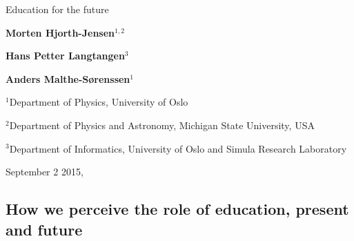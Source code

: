 \documentclass[%
oneside,                 %
final,                   %
10pt]{article}
\begin{document}






\thispagestyle{empty}

\begin{center}
{\LARGE\bf
\begin{spacing}{1.25}
Education for the future
\end{spacing}
}
\end{center}


\begin{center}
{\bf Morten Hjorth-Jensen${}^{1, 2}$} \\ [0mm]
\end{center}


\begin{center}
{\bf Hans Petter Langtangen${}^{3}$} \\ [0mm]
\end{center}


\begin{center}
{\bf Anders Malthe-Sørenssen${}^{1}$} \\ [0mm]
\end{center}

\begin{center}
\centerline{{\small ${}^1$Department of Physics, University of Oslo}}
\centerline{{\small ${}^2$Department of Physics and Astronomy, Michigan State University, USA}}
\centerline{{\small ${}^3$Department of Informatics, University of Oslo and Simula Research Laboratory}}
\end{center}
    

\begin{center} %
September 2 2015, 
\end{center}

\vspace{1cm}


\subsection{How we perceive the role of education, present and future}

\end{document}
